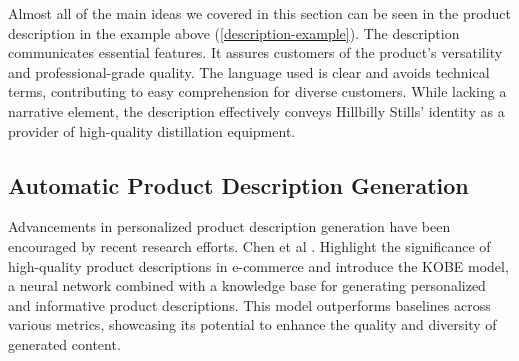 \begin{center}
	\par
\end{center}

Almost all of the main ideas we covered in this section can be seen in the product description in the example above (\autoref{description-example}). The description communicates essential features. It assures customers of the product's versatility and professional-grade quality. The language used is clear and avoids technical terms, contributing to easy comprehension for diverse customers. While lacking a narrative element, the description effectively conveys Hillbilly Stills' identity as a provider of high-quality distillation equipment.

\subsection{Automatic Product Description Generation}\label{Automatic_Product_Description_Generation}

Advancements in personalized product description generation have been encouraged by recent research efforts. Chen et al \cite{Chen_2019}. Highlight the significance of high-quality product descriptions in e-commerce and introduce the KOBE model, a neural network combined with a knowledge base for generating personalized and informative product descriptions. This model outperforms baselines across various metrics, showcasing its potential to enhance the quality and diversity of generated content.

